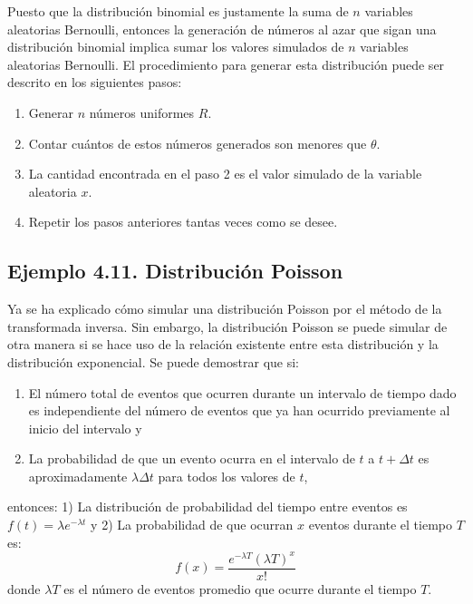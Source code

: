 \documentclass[11pt,letterpaper]{report}
\begin{document}
Puesto que la distribución binomial es justamente la suma de $n$ variables aleatorias Bernoulli, entonces la generación de números al azar que sigan una distribución binomial implica sumar los valores simulados de $n$ variables aleatorias Bernoulli. El procedimiento para generar esta distribución puede ser descrito en los siguientes pasos:
\begin{enumerate}
    \item Generar $n$ números uniformes $R$.
    \item Contar cuántos de estos números generados son menores que $\theta$.
    \item La cantidad encontrada en el paso 2 es el valor simulado de la variable aleatoria $x$.
    \item Repetir los pasos anteriores tantas veces como se desee.
\end{enumerate}

\subsection*{Ejemplo 4.11. Distribución Poisson}
Ya se ha explicado cómo simular una distribución Poisson por el método de la transformada inversa. Sin embargo, la distribución Poisson se puede simular de otra manera si se hace uso de la relación existente entre esta distribución y la distribución exponencial. Se puede demostrar que si:
\begin{enumerate}
    \item El número total de eventos que ocurren durante un intervalo de tiempo dado es independiente del número de eventos que ya han ocurrido previamente al inicio del intervalo y
    \item La probabilidad de que un evento ocurra en el intervalo de $t$ a $t + \Delta t$ es aproximadamente $\lambda \Delta t$ para todos los valores de $t$,
\end{enumerate}
entonces: 1) La distribución de probabilidad del tiempo entre eventos es $f(t) = \lambda e^{-\lambda t}$ y 2) La probabilidad de que ocurran $x$ eventos durante el tiempo $T$ es:
\begin{equation}
f(x) = \frac{e^{-\lambda T} (\lambda T)^x}{x!}
\end{equation}
donde $\lambda T$ es el número de eventos promedio que ocurre durante el tiempo $T$.
\end{document}
